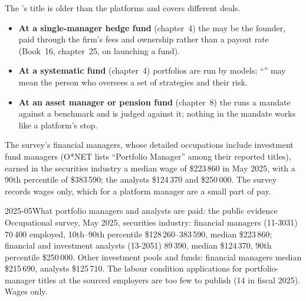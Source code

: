 The 's title is older than the platforms and covers different deals.
\begin{itemize}
\item \textbf{At a single-manager hedge fund} (chapter~4) the  may be the founder, paid through the
firm's fees and ownership rather than a payout rate (Book~16, chapter~25, on launching a fund).
\item \textbf{At a systematic fund} (chapter~4) portfolios are run by models; ``'' may mean the person
who oversees a set of strategies and their risk.
\item \textbf{At an asset manager or pension fund} (chapter~8) the  runs a mandate against a benchmark
and is judged against it; nothing in the mandate works like a platform's stop.
\end{itemize}
The survey's financial managers, whose detailed occupations include investment fund managers (O*NET lists ``Portfolio
Manager'' among their reported titles), earned in the securities industry a median wage of
\$223\,860 in May 2025, with a 90th percentile of \$383\,590; the analysts \$124\,370 and \$250\,000. The survey records
wages only, which for a platform manager are a small part of pay.

\begin{dated}{2025-05}{What portfolio managers and analysts are paid: the public evidence}\label{dat:in:portfolio-manager-and-pod-analyst:pay}
Occupational survey, May 2025, securities industry: financial managers (11-3031) 70\,400 employed, 10th--90th percentile
\$128\,260--383\,590, median \$223\,860; financial and investment analysts (13-2051) 89\,390, median \$124\,370, 90th
percentile \$250\,000. Other investment pools and funds: financial managers median \$215\,690, analysts \$125\,710. The
labour condition applications for portfolio-manager titles at the sourced employers are too few to publish (14 in fiscal
2025). Wages only.
\end{dated}

